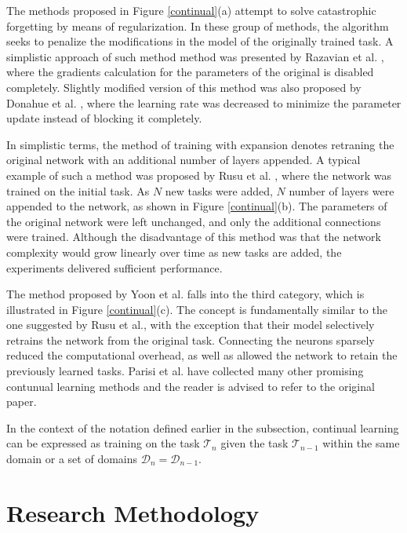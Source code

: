 \documentclass[english, 12pt, a4paper, elec, utf8, a-1b, online]{aaltothesis}
\begin{document}
The methods proposed in Figure \ref{continual}(a) attempt to solve catastrophic forgetting by means of regularization. In these group of methods, the algorithm seeks to penalize the modifications in the model of the originally trained task. A simplistic approach of such method method was presented by Razavian et al. \cite{Razavian2014}, where the gradients calculation for the parameters of the original is disabled completely. Slightly modified version of this method was also proposed by Donahue et al. \cite{Donahue2013}, where the learning rate was decreased to minimize the parameter update instead of blocking it completely. 


In simplistic terms, the method of training with expansion denotes retraning the original network with an additional number of layers appended. A typical example of such a method was proposed by Rusu et al. \cite{Rusu2016}, where the network was trained on the initial task. As $N$ new tasks were added, $N$ number of layers were appended to the network, as shown in Figure \ref{continual}(b). The parameters of the original network were left unchanged, and only the additional connections were trained. Although the disadvantage of this method was that the network complexity would grow linearly over time as new tasks are added, the experiments delivered sufficient performance. 

The method proposed by Yoon et al. \cite{Yoon2017} falls into the third category, which is illustrated in Figure \ref{continual}(c). The concept is fundamentally similar to the one suggested by Rusu et al.\cite{Rusu2016}, with the exception that their model selectively retrains the network from the original task. Connecting the neurons sparsely reduced the computational overhead, as well as allowed the network to retain the previously learned tasks. Parisi et al. have collected many other promising contunual learning methods and the reader is advised to refer to the original paper.   

In the context of the notation defined earlier in the   subsection, continual learning can be expressed as training on the task $\mathcal{T}_n$ given the task $\mathcal{T}_{n-1}$ within the same domain or a set of domains $\mathcal{D}_{n} = \mathcal{D}_{n-1}$.   


\clearpage 

\section{Research Methodology}
\label{Methodology}
\end{document}
